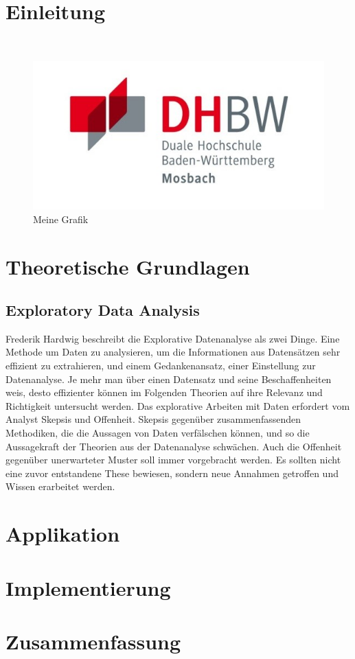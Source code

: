 \chapter{Einleitung} 
    \autocite[vgl.][S.1]{01} \\
    \begin{figure}[h]
        \centering
        \includegraphics{images/dhbw-logo.jpg}
        \caption{Meine Grafik}
        \label{fig:meine-grafik}
    \end{figure}
       

\chapter{Theoretische Grundlagen}

    \section{Exploratory Data Analysis} 
	
	
	\noindent Frederik Hardwig beschreibt die Explorative Datenanalyse als zwei Dinge. Eine Methode um Daten zu analysieren, um die Informationen aus Datensätzen sehr effizient zu extrahieren, und einem Gedankenansatz, einer Einstellung zur Datenanalyse. Je mehr man über einen Datensatz und seine Beschaffenheiten weis, desto effizienter können im Folgenden Theorien auf ihre Relevanz und Richtigkeit untersucht werden. Das explorative Arbeiten mit Daten erfordert vom Analyst Skepsis und Offenheit. Skepsis gegenüber zusammenfassenden Methodiken, die die Aussagen von Daten verfälschen können, und so die Aussagekraft der Theorien aus der Datenanalyse schwächen. Auch die Offenheit gegenüber unerwarteter Muster soll immer vorgebracht werden. Es sollten nicht eine zuvor entstandene These bewiesen, sondern neue Annahmen getroffen und Wissen erarbeitet werden. 
	
	\noident

\chapter{Applikation}


\chapter{Implementierung}


\chapter{Zusammenfassung} %